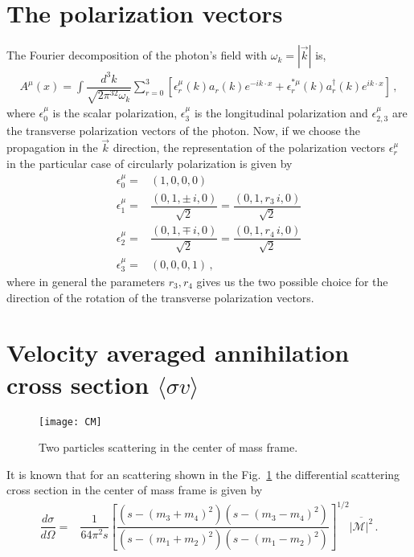 \section{The polarization vectors}
\label{sec:polarization-vectors}
%
The Fourier decomposition of the photon's field with $\omega_k=|\vec{k}|$ is, 
\begin{align}
A^{\mu}(x)=\int\dfrac{d^3k}{\sqrt{2\pi^32\omega_k}}\sum_{r=0}^3\left[\epsilon_r^{\mu}(k)a_r(k)e^{-ik\cdot x} + \epsilon_r^{*\mu}(k)a^{\dagger}_r(k)e^{ik\cdot x}\right]\,,
\end{align}
%
where $\epsilon_0^{\mu}$ is the scalar polarization, $\epsilon_3^{\mu}$ is the longitudinal polarization and $\epsilon_{2,3}^{\mu}$ are the transverse polarization vectors of the photon. Now, if we choose the propagation in the $\vec{k}$ direction, the representation of the polarization vectors $\epsilon_r^{\mu}$ in the particular case of circularly polarization is given by
\begin{align}
\epsilon_0^{\mu} =& (1,0,0,0)\nonumber \\
\epsilon_1^{\mu} =& \dfrac{(0,1,\pm\, i,0)}{\sqrt{2}}= \dfrac{(0,1,r_3\, i,0)}{\sqrt{2}} \nonumber \\
\epsilon_2^{\mu} =& \dfrac{(0,1,\mp\, i,0)}{\sqrt{2}}= \dfrac{(0,1,r_4\, i,0)}{\sqrt{2}} \nonumber \\
\epsilon_3^{\mu} =& (0,0,0,1)\,,
\end{align} 
where in general the parameters $r_3 , r_4$ gives us the two possible choice for the direction of the rotation of the transverse polarization vectors.





\section{ Velocity averaged annihilation cross section $\langle \sigma v \rangle$ }
\label{sec:sigmav}
%
\begin{figure}[h]
\begin{center}
\texttt{[image: CM]}
\end{center}
\caption{Two particles scattering in the center of mass frame.}
\label{fig:cm-frame}
\end{figure}
%
It is known that for an scattering shown in the Fig.~\ref{fig:cm-frame} the differential scattering cross section in the center of mass frame is given by
%
\begin{align}
\dfrac{d\sigma}{d\Omega}=&\dfrac{1}{64\pi^2s}\left[\dfrac{\left(s-(m_3+m_4)^2\right)\left(s-(m_3-m_4)^2\right)}{\left(s-(m_1+m_2)^2\right)\left(s-(m_1-m_2)^2\right)}\right]^{1/2}\overline{{|\mathcal{M}|^2}}\,.
\end{align}
%

